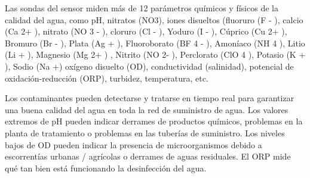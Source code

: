Las sondas del sensor miden más de 12 parámetros químicos y físicos de la calidad del agua, como pH, nitratos (NO3), iones disueltos (fluoruro (F - ), calcio (Ca 2+ ), nitrato (NO 3 - ), cloruro (Cl - ), Yoduro (I - ), Cúprico (Cu 2+ ), Bromuro (Br - ), Plata (Ag + ), Fluoroborato (BF 4 - ), Amoníaco (NH 4 ), Litio (Li + ), Magnesio (Mg 2+ ) , Nitrito (NO 2- ), Perclorato (ClO 4 ), Potasio (K + ), Sodio (Na +) oxígeno disuelto (OD), conductividad (salinidad), potencial de oxidación-reducción (ORP), turbidez, temperatura, etc.

Los contaminantes pueden detectarse y tratarse en tiempo real para garantizar una buena calidad del agua en toda la red de suministro de agua. 
Los valores extremos de pH pueden indicar derrames de productos químicos, problemas en la planta de tratamiento o problemas en las tuberías de suministro. 
Los niveles bajos de OD pueden indicar la presencia de microorganismos debido a escorrentías urbanas / agrícolas o derrames de aguas residuales. 
El ORP mide qué tan bien está funcionando la desinfección del agua.